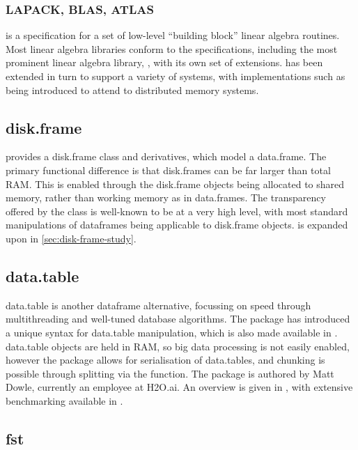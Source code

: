 \subsubsection{LAPACK, BLAS, ATLAS}\label{subsec:blas-lapack}

 is a specification for a set of low-level ``building block'' linear
algebra routines\cite{lawson1979basic}.
Most linear algebra libraries conform to the  specifications, including the most prominent linear algebra library, , with its own set of extensions\cite{demmel1989lapack}.
 has been extended in turn to
support a variety of systems, with implementations such as 
being introduced to attend to distributed memory
systems\cite{choi1992scalapack}.

\subsection{disk.frame}\label{subsec:disk.frame}

 provides a disk.frame class and derivatives, which model a
data.frame.
The primary functional difference is that disk.frames can be far larger than total RAM.
This is enabled through the disk.frame objects being allocated to shared memory, rather than working memory as in data.frames.
The transparency offered by the class is well-known to be at a very high level, with most standard manipulations of dataframes being applicable to disk.frame objects.
 is expanded upon in \cref{sec:disk-frame-study}.

\subsection{data.table}\label{subsec:data.table}

data.table is another dataframe alternative, focussing on speed through
multithreading and well-tuned database algorithms\cite{dowle19}.
The package has introduced a unique syntax for data.table manipulation, which is also made available in .
data.table objects are held
in RAM, so big data processing is not easily enabled, however the
package allows for serialisation of data.tables, and chunking is
possible through splitting via the  function.
The package is authored by Matt Dowle, currently an employee at H2O.ai.
An overview is given in \cite{dowle19:_introd}, with extensive benchmarking available in \cite{dowle19:_bench}.

\subsection{fst}\label{sec:fst}

